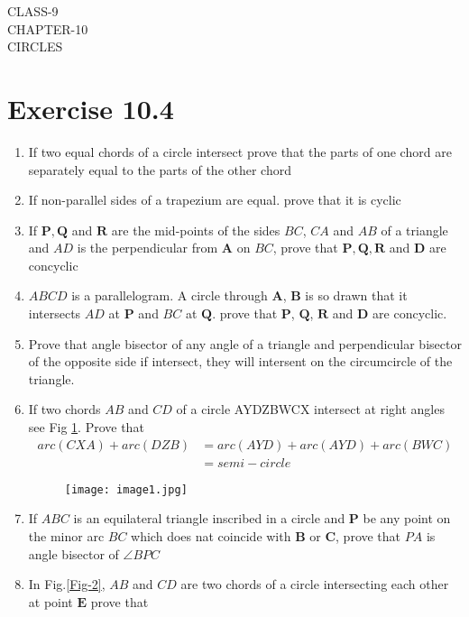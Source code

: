 \documentclass[12pt]{article}
\providecommand{\brak}[1]{\ensuremath{\left(#1\right)}}
\let\vec\mathbf
\begin{document}
\begin{center}
\textbf\large{CLASS-9\\CHAPTER-10 \\ CIRCLES}
\end{center}
\section*{Exercise 10.4}
\begin{enumerate}
\item If two equal chords of a circle intersect prove that the parts of one chord are separately equal to the parts of the other chord
\item If non-parallel sides of a trapezium are equal. prove that it is cyclic
\item If $\vec{P},\vec{Q}$ and $\vec{R}$ are the mid-points of the sides $BC$, $CA$ and $AB$ of a triangle and $AD$ is the perpendicular from $\vec{A}$ on $BC$, prove that $\vec{P},\vec{Q},\vec{R}$ and $\vec{D}$ are concyclic
\item $ABCD$ is a parallelogram. A circle through $\vec{A}$, $\vec{B}$ is so drawn that it intersects $AD$ at $\vec{P}$ and $BC$ at $\vec{Q}$. prove that $\vec{P}$, $\vec{Q}$, $\vec{R}$ and $\vec{D}$ are concyclic.
\item Prove that angle bisector of any angle of a triangle and perpendicular bisector of the opposite side if intersect, they will intersent on the circumcircle of the triangle.
\item If two chords $AB$ and $CD$ of a circle AYDZBWCX intersect at right angles see Fig \ref{Fig-1}. Prove that
	\begin{align*}
		arc\brak{CXA}+arc\brak{DZB}&=arc\brak{AYD}+arc\brak{AYD}+arc\brak{BWC}\\&=semi-circle
	\end{align*}
\begin{figure}[h!]                                   \texttt{[image: image1.jpg]}                            \caption{}                                       \label{Fig-1}                    \end{figure}
	\item If $ABC$ is an equilateral triangle inscribed in a circle and $\vec{P}$ be any point on the minor arc $BC$ which does nat coincide with $\vec{B}$ or $\vec{C}$, prove that $PA$ is angle bisector of $\angle BPC$
	\item In Fig.\ref{Fig-2}, $AB$ and $CD$ are two chords of a circle intersecting each other at point $\vec{E}$ prove that 

\end{enumerate}
\end{document}
